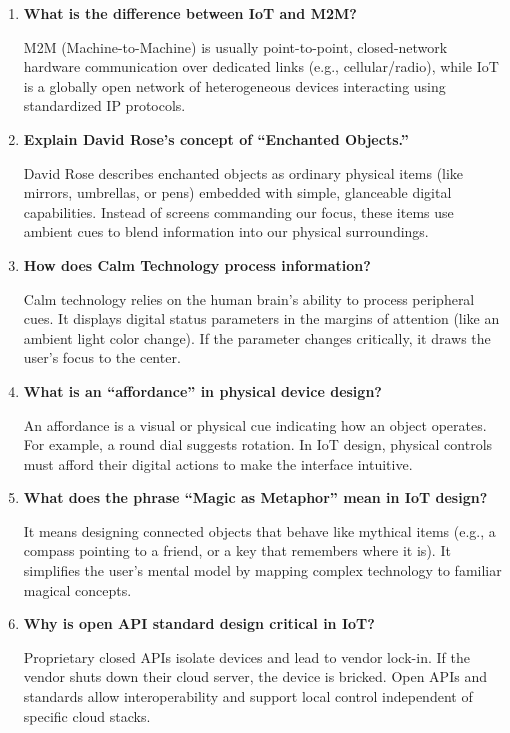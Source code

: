 \documentclass[12pt,a4paper]{article}
\newcommand{\Q}[1]{\textbf{#1}\par\noindent\ignorespaces}
\begin{document}
\begin{tcolorbox}[exambox, title={\textbf{Frequently Asked / Viva Questions}}]
\begin{enumerate}[leftmargin=*, topsep=0pt, label=\textbf{Q\arabic*.}, itemsep=6pt]
  \item \Q{What is the difference between IoT and M2M?}
        M2M (Machine-to-Machine) is usually point-to-point, closed-network hardware communication over dedicated links (e.g., cellular/radio), while IoT is a globally open network of heterogeneous devices interacting using standardized IP protocols.
        
  \item \Q{Explain David Rose's concept of ``Enchanted Objects.''}
        David Rose describes enchanted objects as ordinary physical items (like mirrors, umbrellas, or pens) embedded with simple, glanceable digital capabilities. Instead of screens commanding our focus, these items use ambient cues to blend information into our physical surroundings.
        
  \item \Q{How does Calm Technology process information?}
        Calm technology relies on the human brain's ability to process peripheral cues. It displays digital status parameters in the margins of attention (like an ambient light color change). If the parameter changes critically, it draws the user's focus to the center.
        
  \item \Q{What is an ``affordance'' in physical device design?}
        An affordance is a visual or physical cue indicating how an object operates. For example, a round dial suggests rotation. In IoT design, physical controls must afford their digital actions to make the interface intuitive.
        
  \item \Q{What does the phrase ``Magic as Metaphor'' mean in IoT design?}
        It means designing connected objects that behave like mythical items (e.g., a compass pointing to a friend, or a key that remembers where it is). It simplifies the user's mental model by mapping complex technology to familiar magical concepts.
        
  \item \Q{Why is open API standard design critical in IoT?}
        Proprietary closed APIs isolate devices and lead to vendor lock-in. If the vendor shuts down their cloud server, the device is bricked. Open APIs and standards allow interoperability and support local control independent of specific cloud stacks.
        

\end{enumerate}
\end{tcolorbox}
\end{document}
